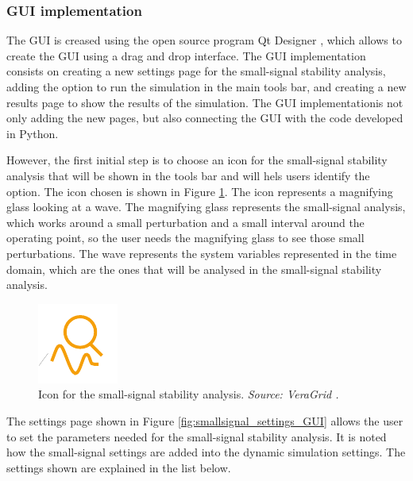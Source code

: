 \subsubsection{GUI implementation}

The GUI is creased using the open source program Qt Designer \cite{qt_designer}, which allows to create the GUI using a drag 
and drop interface. The GUI implementation consists on creating a new settings page for the small-signal stability analysis,
adding the option to run the simulation in the main tools bar, and creating a new results page to show the results of the simulation. 
The GUI implementationis not only adding the new pages, but also connecting the GUI with the code developed in Python.

However, the first initial step is to choose an icon for the small-signal stability analysis that will be shown in the tools bar and will 
hels users identify the option. The icon chosen is shown in Figure \ref{fig:small_signal_icon}. The icon represents a magnifying glass 
looking at a wave. The magnifying glass represents the small-signal analysis, which works around a small perturbation and a small interval
around the operating point, so the user needs the magnifying glass to see those small perturbations. The wave represents the system variables
represented in the time domain, which are the ones that will be analysed in the small-signal stability analysis.

\begin{figure}[H]
  \centering
  \includegraphics[width=0.25\linewidth]{inkscape_svg/small_signal_icon.pdf}
  \caption{Icon for the small-signal stability analysis. \textit{Source: VeraGrid \cite{veragrid}.}}
  \label{fig:small_signal_icon}
\end{figure}

The settings page shown in Figure \ref{fig:smallsignal_settings_GUI} allows the user to set the parameters needed for the small-signal stability analysis.
It is noted how the small-signal settings are added into the dynamic simulation settings. The settings shown are explained in the list below.

